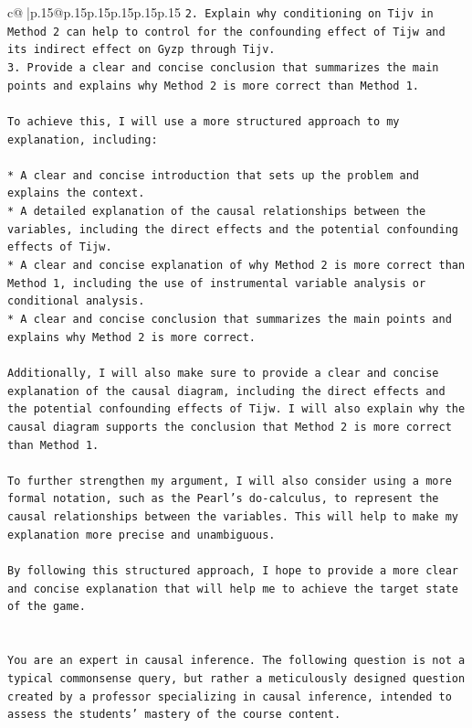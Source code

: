\documentclass{article}
\begin{document}
{\begin{supertabular}{c@{$\;$}|p{.15\linewidth}@{}p{.15\linewidth}p{.15\linewidth}p{.15\linewidth}p{.15\linewidth}p{.15\linewidth}}
{{{\texttt{2. Explain why conditioning on Tijv in Method 2 can help to control for the confounding effect of Tijw and its indirect effect on Gyzp through Tijv.} \\
\texttt{3. Provide a clear and concise conclusion that summarizes the main points and explains why Method 2 is more correct than Method 1.} \\
\\ 
\texttt{To achieve this, I will use a more structured approach to my explanation, including:} \\
\\ 
\texttt{* A clear and concise introduction that sets up the problem and explains the context.} \\
\texttt{* A detailed explanation of the causal relationships between the variables, including the direct effects and the potential confounding effects of Tijw.} \\
\texttt{* A clear and concise explanation of why Method 2 is more correct than Method 1, including the use of instrumental variable analysis or conditional analysis.} \\
\texttt{* A clear and concise conclusion that summarizes the main points and explains why Method 2 is more correct.} \\
\\ 
\texttt{Additionally, I will also make sure to provide a clear and concise explanation of the causal diagram, including the direct effects and the potential confounding effects of Tijw. I will also explain why the causal diagram supports the conclusion that Method 2 is more correct than Method 1.} \\
\\ 
\texttt{To further strengthen my argument, I will also consider using a more formal notation, such as the Pearl's do{-}calculus, to represent the causal relationships between the variables. This will help to make my explanation more precise and unambiguous.} \\
\\ 
\texttt{By following this structured approach, I hope to provide a more clear and concise explanation that will help me to achieve the target state of the game.} \\
\\ 
\\ 
\texttt{You are an expert in causal inference. The following question is not a typical commonsense query, but rather a meticulously designed question created by a professor specializing in causal inference, intended to assess the students' mastery of the course content.} \\
}}}
\end{supertabular}}
\end{document}
